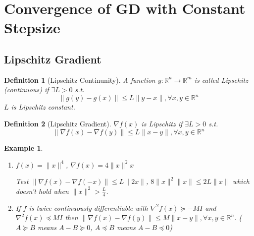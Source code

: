 \documentclass[11pt,a4paper]{article}
\newtheorem{example}{Example}
\newtheorem{definition}{Definition}
\begin{document}
\section{Convergence of GD with Constant Stepsize}
\subsection{Lipschitz Gradient}
\begin{definition}[Lipschitz Continunity]
A function $y: \mathbb{R}^n \rightarrow	\mathbb{R}^m$ is called Lipschitz (continuous) if $\exists L>0$ s.t.
$$\|g(y)-g(x)\|\leq L\|y-x\|,\forall x,y\in \mathbb{R}^n$$
$L$ is Lipschitz constant.
\end{definition}

\begin{definition}[Lipschitz Gradient]
    $\nabla f(x)$ is Lipschitz if $\exists L>0$ s.t. $$\|\nabla f(x)-\nabla f(y)\|\leq L\|x-y\|,\forall x,y\in \mathbb{R}^n$$
\end{definition}

\begin{example}
    \quad

\begin{enumerate}
    \item $f(x)=\|x\|^4$, $\nabla f(x)=4\|x\|^2x$
    
    Test $\|\nabla f(x)-\nabla f(-x)\|\leq L\|2x\|$, $8\|x\|^2\|x\|\leq 2L\|x\|$ which doesn't hold when $\|x\|^2>\frac{L}{4}$.
    \item If $f$ is twice continuously differentiable with $\nabla^2 f(x)\succeq -MI$ and $\nabla^2 f(x)\preceq  MI$ then $\|\nabla f(x)-\nabla f(y)\|\leq M\|x-y\|,\forall x,y\in \mathbb{R}^n$. ($A\succeq B$ means $A-B\succeq 0$, $A\preceq B$ means $A-B\preceq 0$)
\end{enumerate}
\end{example}
\end{document}
